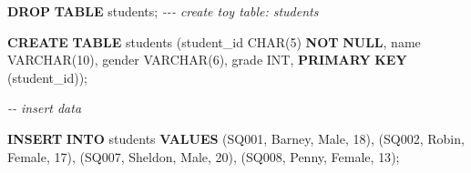 \documentclass[
]{book}
\newenvironment{Shaded}{\begin{snugshade}}{\end{snugshade}}
\newcommand{\CommentTok}[1]{\textcolor[rgb]{0.56,0.35,0.01}{\textit{#1}}}
\newcommand{\DataTypeTok}[1]{\textcolor[rgb]{0.13,0.29,0.53}{#1}}
\newcommand{\DecValTok}[1]{\textcolor[rgb]{0.00,0.00,0.81}{#1}}
\newcommand{\KeywordTok}[1]{\textcolor[rgb]{0.13,0.29,0.53}{\textbf{#1}}}
\newcommand{\NormalTok}[1]{#1}
\newcommand{\StringTok}[1]{\textcolor[rgb]{0.31,0.60,0.02}{#1}}
\begin{document}
\begin{Shaded}
\begin{Highlighting}[]
\KeywordTok{DROP} \KeywordTok{TABLE}\NormalTok{ students;}
\CommentTok{{-}{-}{-} create toy table: students}

\KeywordTok{CREATE} \KeywordTok{TABLE}\NormalTok{ students}
\NormalTok{(student\_id }\DataTypeTok{CHAR}\NormalTok{(}\DecValTok{5}\NormalTok{) }\KeywordTok{NOT} \KeywordTok{NULL}\NormalTok{,}
\NormalTok{name }\DataTypeTok{VARCHAR}\NormalTok{(}\DecValTok{10}\NormalTok{),}
\NormalTok{gender }\DataTypeTok{VARCHAR}\NormalTok{(}\DecValTok{6}\NormalTok{),}
\NormalTok{grade }\DataTypeTok{INT}\NormalTok{,}
\KeywordTok{PRIMARY} \KeywordTok{KEY}\NormalTok{ (student\_id));}

\CommentTok{{-}{-} insert data}

\KeywordTok{INSERT} \KeywordTok{INTO}\NormalTok{ students}
\KeywordTok{VALUES} 
\NormalTok{(}\StringTok{\textquotesingle{}SQ001\textquotesingle{}}\NormalTok{, }\StringTok{\textquotesingle{}Barney\textquotesingle{}}\NormalTok{, }\StringTok{\textquotesingle{}Male\textquotesingle{}}\NormalTok{, }\DecValTok{18}\NormalTok{),}
\NormalTok{(}\StringTok{\textquotesingle{}SQ002\textquotesingle{}}\NormalTok{, }\StringTok{\textquotesingle{}Robin\textquotesingle{}}\NormalTok{, }\StringTok{\textquotesingle{}Female\textquotesingle{}}\NormalTok{, }\DecValTok{17}\NormalTok{),}
\NormalTok{(}\StringTok{\textquotesingle{}SQ007\textquotesingle{}}\NormalTok{, }\StringTok{\textquotesingle{}Sheldon\textquotesingle{}}\NormalTok{, }\StringTok{\textquotesingle{}Male\textquotesingle{}}\NormalTok{, }\DecValTok{20}\NormalTok{),}
\NormalTok{(}\StringTok{\textquotesingle{}SQ008\textquotesingle{}}\NormalTok{, }\StringTok{\textquotesingle{}Penny\textquotesingle{}}\NormalTok{, }\StringTok{\textquotesingle{}Female\textquotesingle{}}\NormalTok{, }\DecValTok{13}\NormalTok{);}
\end{Highlighting}
\end{Shaded}


  
\end{document}
